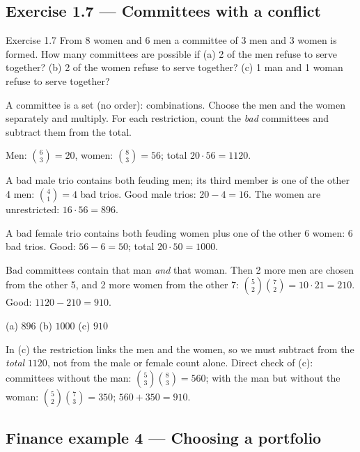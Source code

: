 \subsection{Exercise 1.7 --- Committees with a conflict}

\begin{task}{Exercise 1.7}
	From 8 women and 6 men a committee of 3 men and 3 women is formed. How many
	committees are possible if (a) 2 of the men refuse to serve together?
	(b) 2 of the women refuse to serve together? (c) 1 man and 1 woman refuse
	to serve together?
\end{task}
\workspace{4cm}

\ifsolutions
	\soltitle
	\idea A committee is a set (no order): combinations. Choose the men and the
	women separately and multiply. For each restriction, count the \emph{bad}
	committees and subtract them from the total.

	 Men: $\binom63=20$, women: $\binom83=56$; total
	$20\cdot56 = 1120$.

	 A bad male trio contains both feuding men; its third member is one
	of the other 4 men: $\binom41=4$ bad trios. Good male trios: $20-4=16$. The
	women are unrestricted: $16\cdot56 = 896$.

	 A bad female trio contains both feuding women plus one of the
	other 6 women: $6$ bad trios. Good: $56-6=50$; total $20\cdot50=1000$.

	 Bad committees contain that man \emph{and} that woman. Then 2
	more men are chosen from the other 5, and 2 more women from the other 7:
	$\binom52\binom72 = 10\cdot21 = 210$. Good: $1120-210=910$.

	\begin{answer}
		(a) $896$ \quad (b) $1000$ \quad (c) $910$
	\end{answer}
	\begin{remark}
		In (c) the restriction links the men and the women, so we must subtract
		from the \emph{total} $1120$, not from the male or female count alone.
		Direct check of (c): committees without the man: $\binom53\binom83=560$;
		with the man but without the woman: $\binom52\binom73=350$;
		$560+350=910$.
	\end{remark}
\fi

\subsection{Finance example 4 --- Choosing a portfolio}

